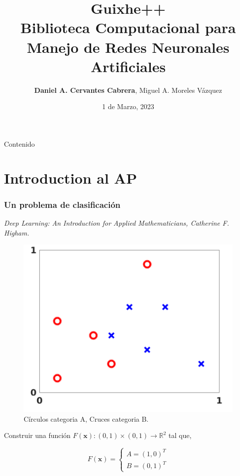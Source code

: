 \documentclass[aspectratio=1610]{beamer}
\title{{\huge Guixhe++ \\
    Biblioteca Computacional para Manejo de Redes Neuronales Artificiales}}
\author{ \textbf{Daniel A. Cervantes Cabrera}\footfullcite{INFOTEC-CDMX},
        Miguel A. Moreles Vázquez\footfullcite{CIMAT-GTO}  }
\date{1 de Marzo, 2023}
\begin{document}
\begin{frame}[plain]
  \titlepage
\end{frame}


\begin{frame}{Contenido}
  \tableofcontents

  \end{frame}





\section{Introduction al AP}

\begin{frame}
  \frametitle{Un problema de clasificaci\'on}
\textit{  Deep Learning: An Introduction for Applied Mathematicians, Catherine F. Higham.}
  \begin{figure}[h]
    \centering
    \includegraphics[scale=0.25]{fig}
    \caption{C\'irculos categoria A, Cruces categoria B. }
  \end{figure}
  
  Construir una función $F(\mathbf{x}):(0,1)\times (0,1)\to \mathbb{R}^2$ tal que,
  
  \begin{displaymath}
    F(\mathbf{x}) =
    \begin{cases}
      A = (1,0)^T \\
      B = (0,1)^T
    \end{cases}  
  \end{displaymath}
  
\end{frame}
\end{document}
